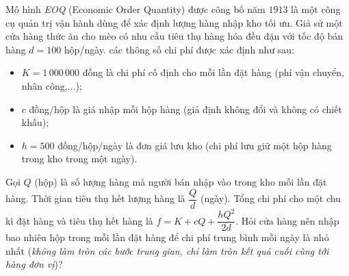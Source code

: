 \begin{ex}%
	Mô hình \textit{EOQ} (Economic Order Quantity) được công bố năm $1913$ là một công cụ quản trị vận hành dùng để xác định lượng hàng nhập kho tối ưu. Giả sử một cửa hàng thức ăn cho mèo có nhu cầu tiêu thụ hàng hóa đều đặn với tốc độ bán hàng $d=100$ hộp/ngày. các thông số chi phí được xác định như sau:
	\begin{itemize} 
		\item $K=1\,000\,000$ đồng là chi phí cố định cho mỗi lần đặt hàng (phí vận chuyển, nhân công,...);
		\item $c$ đồng/hộp là giá nhập mỗi hộp hàng (giả định không đổi và không có chiết khấu);
		\item $h=500$ đồng/hộp/ngày là đơn giá lưu kho (chi phí lưu giữ một hộp hàng trong kho trong một ngày).
	\end{itemize}
	Gọi $Q$ (hộp) là số lượng hàng mà người bán nhập vào trong kho mỗi lần đặt hàng. Thời gian tiêu thụ hết lượng hàng là $\dfrac{Q}{d}$ (ngày). Tổng chi phí cho một chu kì đặt hàng và tiêu thụ hết hàng là $f=K+cQ+\dfrac{hQ^2}{2d}$. Hỏi cửa hàng nên nhập bao nhiêu hộp trong mỗi lần đặt hàng để chi phí trung bình mỗi ngày là nhỏ nhất (\textit{không làm tròn các bước trung gian, chỉ làm tròn kết quả cuối cùng tới hàng đơn vị})?
	\par {}
\end{ex}

